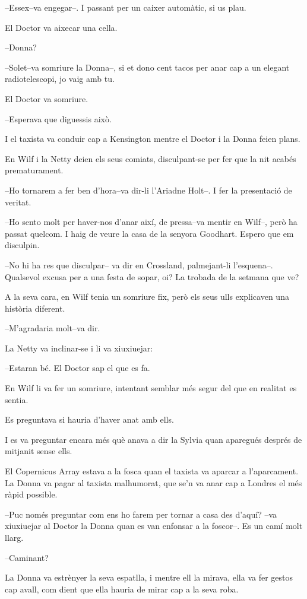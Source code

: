 --Essex--va engegar--. I passant per un caixer automàtic, si us plau.

El Doctor va aixecar una cella.

--Donna?

--Solet--va somriure la Donna--, si et dono cent tacos per anar cap a un
elegant radiotelescopi, jo vaig amb tu.

El Doctor va somriure.

--Esperava que diguessis això.

I el taxista va conduir cap a Kensington mentre el Doctor i la Donna
feien plans.

En Wilf i la Netty deien els seus comiats, disculpant-se per fer que la
nit acabés prematurament.

--Ho tornarem a fer ben d'hora--va dir-li l'Ariadne Holt--. I fer la
presentació de veritat.

--Ho sento molt per haver-nos d'anar així, de pressa--va mentir en
Wilf--, però ha passat quelcom. I haig de veure la casa de la senyora
Goodhart. Espero que em disculpin.

--No hi ha res que disculpar-- va dir en Crossland, palmejant-li
l'esquena--. Qualsevol excusa per a una festa de sopar, oi? La trobada
de la setmana que ve?

A la seva cara, en Wilf tenia un somriure fix, però els seus ulls
explicaven una història diferent.

--M'agradaria molt--va dir.

La Netty va inclinar-se i li va xiuxiuejar:

--Estaran bé. El Doctor sap el que es fa.

En Wilf li va fer un somriure, intentant semblar més segur del que en
realitat es sentia.

Es preguntava si hauria d'haver anat amb ells.

I es va preguntar encara més què anava a dir la Sylvia quan aparegués
després de mitjanit sense ells.

El Copernicus Array estava a la fosca quan el taxista va aparcar a
l'aparcament. La Donna va pagar al taxista malhumorat, que se'n va anar
cap a Londres el més ràpid possible.

--Puc només preguntar com ens ho farem per tornar a casa des d'aquí?
--va xiuxiuejar al Doctor la Donna quan es van enfonsar a la foscor--.
Es un camí molt llarg.

--Caminant?

La Donna va estrènyer la seva espatlla, i mentre ell la mirava, ella va
fer gestos cap avall, com dient que ella hauria de mirar cap a la seva
roba.

